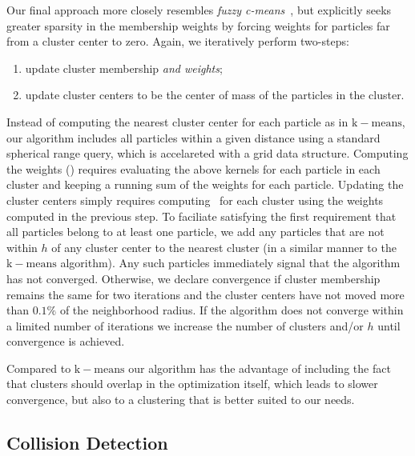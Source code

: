 \documentclass[review]{acmsiggraph}
\begin{document}
Our final approach more closely resembles {\em fuzzy c-means}~\cite{Dunn:1973:AFR,Bezdek:1981:PRF}, 
but explicitly seeks greater sparsity in the membership weights by forcing
weights for particles far from a cluster center to zero.
Again, we iteratively perform two-steps:
\begin{enumerate}
\item update cluster membership {\em and weights};
\item update cluster centers to be the center of mass of the particles in the cluster.
\end{enumerate}
Instead of computing the nearest cluster center for each particle as in $\mathrm{k-means}$, our algorithm includes all particles within a given distance
using a standard spherical range query, which is accelareted with a grid data structure.  Computing the weights 
() requires evaluating the above 
kernels for each particle in each cluster and keeping a running sum of the weights for each particle.  Updating the cluster centers simply requires 
computing~ for each cluster using the weights computed in the previous step.  To faciliate satisfying the first requirement that 
all particles belong to at least one particle, we add any particles that are not within $h$ of any cluster center to the nearest cluster 
(in a similar manner to the $\mathrm{k-means}$ algorithm).  Any such particles immediately signal that the algorithm has not converged.  Otherwise,
we declare convergence if cluster membership remains the same for two iterations and the cluster centers have not moved more than $0.1\%$ of the neighborhood radius.   
If the algorithm
does not converge within a limited number of iterations we increase the number of clusters and/or $h$ until convergence is achieved.

Compared to $\mathrm{k-means}$ our algorithm has the advantage of including the fact that clusters should overlap in the optimization itself, which leads to slower convergence, but
also to a clustering that is better suited to our needs.

\subsection{Collision Detection}
\end{document}
